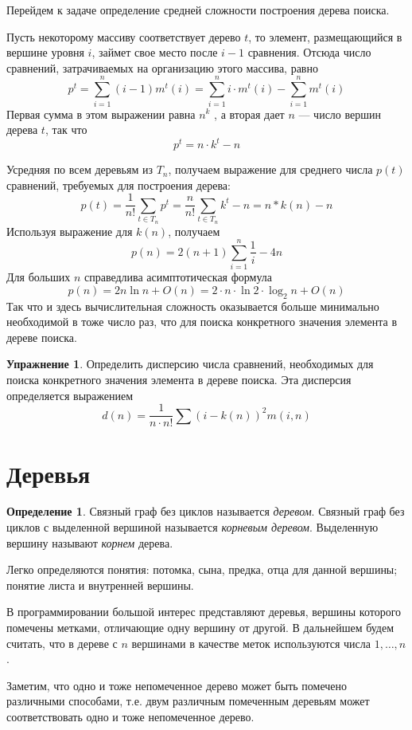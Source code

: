 \documentclass[12pt,a4paper]{article}
\theoremstyle{plain}
\theoremstyle{definition}
\newtheorem{definition}{Определение}
\newtheorem*{task}{Упражнение}
\theoremstyle{remark}
\begin{document}
Перейдем к задаче определение средней сложности построения дерева поиска.

Пусть некоторому массиву соответствует дерево $t$, то элемент, размещающийся в вершине уровня $i$, займет свое место после $i-1$ сравнения. Отсюда число сравнений, затрачиваемых на организацию этого массива, равно
\[ p^t = \sum_{i=1}^n (i-1)m^t(i) = \sum_{i=1}^n i\cdot m^t(i) - \sum_{i=1}^n m^t(i) \]
Первая сумма в этом выражении равна $n^k$ , а вторая дает $n$ --- число вершин дерева $t$, так что
\[ p^t =n\cdot k^t - n \]

Усредняя по всем деревьям из $T_n$, получаем выражение для среднего числа $p(t)$ сравнений, требуемых для построения дерева:
\[ p(t) = \frac{1}{n!} \sum_{t\in T_n} p^t = \frac{n}{n!} \sum_{t\in T_n} k^t - n = n*k(n) - n \]
Используя выражение для $k(n)$, получаем
\[ p(n) = 2(n+1)\sum_{i=1}^n \frac{1}{i} - 4n \]
Для больших $n$ справедлива асимптотическая формула
\[ p(n) = 2 n \ln n + O(n) = 2\cdot n\cdot \ln 2 \cdot \log_2 n + O(n) \]
Так что и здесь вычислительная сложность оказывается больше минимально необходимой в тоже число раз, что для поиска конкретного значения элемента в дереве поиска.

\begin{task}
Определить дисперсию числа сравнений, необходимых для поиска конкретного значения элемента в дереве поиска. Эта дисперсия определяется выражением
\[ d(n) = \frac{1}{n\cdot n!} \sum (i-k(n))^2 m(i, n) \]
\end{task}

\section{Деревья}

\begin{definition}
Связный граф без циклов называется \emph{деревом}. Связный граф без циклов с выделенной вершиной называется \emph{корневым деревом}. Выделенную вершину называют \emph{корнем} дерева.
\end{definition}

Легко определяются понятия: потомка, сына, предка, отца для данной вершины; понятие листа и внутренней вершины.

В программировании большой интерес представляют деревья, вершины которого помечены метками, отличающие одну вершину от другой. В дальнейшем будем считать, что в дереве с $n$ вершинами в качестве меток используются числа $1,\ldots,n$.

Заметим, что одно и тоже непомеченное дерево может быть помечено различными способами, т.е. двум различным помеченным деревьям может соответствовать одно и тоже непомеченное дерево.
\end{document}
